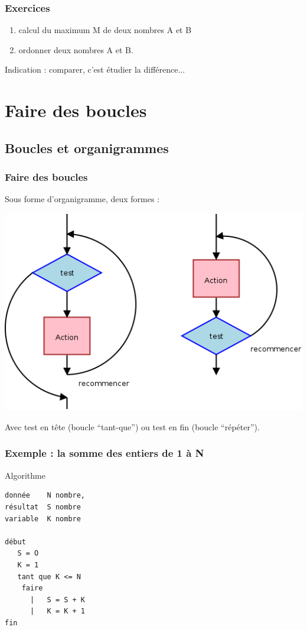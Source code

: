 \begin{frame}
\frametitle{Exercices}
\begin{enumerate}
\item \alert{calcul du maximum} M  de deux
nombres A et B


\item \alert{ordonner deux nombres} A et B.

\end{enumerate}

\alert{Indication} : comparer, c'est étudier la différence...
\end{frame}




\section{Faire des boucles}
\subsection{Boucles et organigrammes}
\begin{frame}
\frametitle{Faire des boucles}

Sous forme d'organigramme, deux formes :

\includegraphics[width=0.8\linewidth]{figures/boucles}    

Avec \alert{test en tête} (boucle ``tant-que'') ou \alert{test en fin} (boucle ``répéter'').
\end{frame}

\begin{frame}[containsverbatim]
\frametitle{Exemple :  la somme des entiers de 1 à N}

\alert{Algorithme}

\begin{lstlisting}[frame=single]
donnée    N nombre, 
résultat  S nombre
variable  K nombre

début
   S = O
   K = 1
   tant que K <= N
    faire
      |   S = S + K
      |   K = K + 1
fin
\end{lstlisting}
\end{frame}


